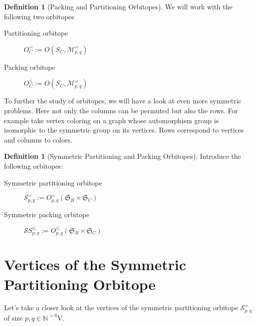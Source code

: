 \documentclass[a4paper]{amsart}
\theoremstyle{lemma}
\theoremstyle{definition}
\newtheorem{defn}[theorem]{Definition}
\theoremstyle{remark}
\theoremstyle{example}
\newcommand{\lr}[1]{\ensuremath{\left( #1 \right)}}
\newcommand{\naturals}{\ensuremath{\mathbb{N}}}
\newcommand{\M}{\ensuremath{\mathcal{M}}}
\newcommand{\calS}{\ensuremath{\mathcal{S}}}
\newcommand{\Sym}{\ensuremath{\mathfrak{S}}}
\newcommand{\SymRC}{\ensuremath{\Sym_R \times \Sym_C}}
\begin{document}


\begin{defn}[Packing and Partitioning Orbitopes]
  We will work with the following two orbitopes
  \begin{description}
    \item[Partitioning orbitope] \(O^=_C := O \lr{S_C, \M_{p,q}^=}\)
    \item[Packing orbitope] \(O^{\leq}_C := O \lr{S_C, \M_{p,q}^=}\)
   \end{description}
\end{defn}

To further the study of orbitopes, we will have a look at even more
symmetric problems.  Here not only the columns can be permuted but
also the rows.  For example take vertex coloring on a graph whose
automorphism group is isomorphic to the symmetric group on its
vertices.  Rows correspond to vertices and columns to colors.

\begin{defn}[Symmetric Partitioning and Packing Orbitopes]
Introduce the following orbitopes:
\begin{description}
\item[Symmetric partitioning orbitope] \(\calS^=_{p,q} := O^=_{p, q} \lr{\SymRC} \)
\item[Symmetric packing orbitope] \(\calS{S}^\leq_{p,q} := O^\leq_{p, q} \lr{\SymRC} \)
\end{description}
\end{defn}

\section{Vertices of the Symmetric Partitioning Orbitope}
Let's take a closer look at the vertices of the symmetric partitioning
orbitope \(\calS^=_{p, q}\) of size \(p, q \in \naturals^{>0}\)V.
\end{document}
